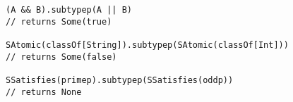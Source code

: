 \begin{lstlisting}[style=scalaioScala]
(A && B).subtypep(A || B)
// returns Some(true)
  
SAtomic(classOf[String]).subtypep(SAtomic(classOf[Int]))
// returns Some(false)
  
SSatisfies(primep).subtypep(SSatisfies(oddp))
// returns None
\end{lstlisting}
